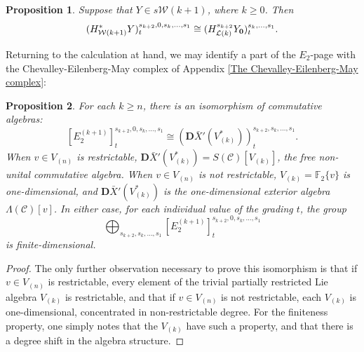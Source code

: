 \documentclass[11pt]{amsart} \renewcommand{\baselinestretch}{1.2}
\theoremstyle{plain}
\newtheorem{thm}{Theorem}[section] %
\newtheorem{prop}[thm]{Proposition}
\numberwithin{equation}{section} %
\theoremstyle{plain}
\newtheorem{thm}{Theorem}[chapter] %
\newtheorem{prop}[thm]{Proposition}
\numberwithin{equation}{chapter} %
\renewcommand{\to}{\longrightarrow}
\newcommand{\scrC}{\mathscr{C}}
\newcommand{\calL}{\mathcal{L}}
\newcommand{\calw}{\mathcal{W}}
\newcommand{\calMv}{\mathcal{M}\dver}
\newcommand{\calMh}{\mathcal{M}\dhor}
\newcommand{\CommOperad}{{\scrC}}
\newcommand{\UEAX}{\bar{X}'}%
\newcommand{\F}{\mathbb{F}}
\newcommand{\Ftwo}{\F_2}
\newcommand{\E}[5]{[E^{#1}_{#2}#3]^{#4}_{#5}}
\newcommand{\dver}{_\mathrm{v}}
\newcommand{\dhor}{_\mathrm{h}}
\newcommand{\dual}{\mathbf{D}}
\begin{document}
\begin{Calculations of HWn}
\begin{prop}
Suppose that $Y\in s\calw(k+1)$, where $k\geq0$. Then
\[(H^*_{\calw(k+1)}Y)^{s_{k+2},0,s_k,\ldots,s_1}_{t}\cong (H^{s_{k+2}}_{\calL(k)}Y_\textup{\textbf{0}})^{s_k,\ldots,s_1}_t.\]
\end{prop}
Returning to the calculation at hand, we may identify a part of the $E_2$-page with the Chevalley-Eilenberg-May complex of Appendix \ref{The Chevalley-Eilenberg-May complex}:
\begin{prop}
\label{calculation in internal dimension zero}
For each $k\geq n$, there is an isomorphism of commutative algebras:
\[\E{(k+1)}{2}{}{s_{k+2},0,s_k,\ldots,s_1}{t} \cong(\dual\UEAX(V^*_{(k)}))^{s_{k+2},s_k,\ldots,s_1}_t.\]
When $v\in V_{(n)}$ is restrictable,  $\dual\UEAX(V^*_{(k)})=S(\CommOperad)[V_{(k)}]$, the free non-unital commutative algebra. When $v\in V_{(n)}$ is not restrictable, $V_{(k)}=\Ftwo\{v\}$ is one-dimensional, and $\dual\UEAX(V^*_{(k)})$ is the one-dimensional exterior algebra $\Lambda(\CommOperad)[v]$. In either case, for each individual value of the grading $t$, the group \[\bigoplus_{s_{k+2},s_k,\ldots,s_1}\E{(k+1)}{2}{}{s_{k+2},0,s_k,\ldots,s_1}{t}\] is finite-dimensional.
\end{prop}
\begin{proof}
The only further observation necessary to prove this isomorphism is that if $v\in V_{(n)}$ is restrictable, every element of the trivial partially restricted Lie algebra $V_{(k)}$ is restrictable, and that if $v\in V_{(n)}$ is not restrictable, each $V_{(k)}$ is one-dimensional, concentrated in non-restrictable degree. For the finiteness property, one simply notes that the $V_{(k)}$ have such a property, and that there is a degree shift in the algebra structure.
\end{proof}


\end{Calculations of HWn}
\end{document}
